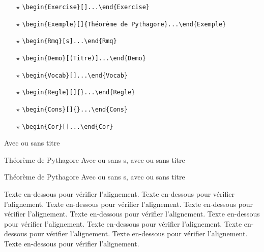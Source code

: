 \documentclass[12pt,french,oneside]{book}
\begin{document}
\begin{spacing}{1.2}
\begin{itemize}
\item[$\star$] \verb=\begin{Exercise}[]...\end{Exercise}=\,

\item[$\star$] \verb=\begin{Exemple}[]{Théorème de Pythagore}...\end{Exemple}=\,

\item[$\star$] \verb=\begin{Rmq}[s]...\end{Rmq}=\,

\item[$\star$] \verb=\begin{Demo}[(Titre)]...\end{Demo}=\,

\item[$\star$] \verb=\begin{Vocab}[]...\end{Vocab}=\,

\item[$\star$] \verb=\begin{Regle}[]{}...\end{Regle}=\,

\item[$\star$] \verb=\begin{Cons}[]{}...\end{Cons}=\,

\item[$\star$] \verb=\begin{Cor}[]...\end{Cor}=\,

\end{itemize}

\begin{Thm}
Avec ou sans titre
\end{Thm}

\begin{Prop}[s]{Théorème de Pythagore}
Avec ou sans s, avec ou sans titre
\end{Prop}


\begin{Defi}[]{Théorème de Pythagore}
Avec ou sans s, avec ou sans titre
\end{Defi}

Texte en-dessous pour vérifier l'alignement. 
Texte en-dessous pour vérifier l'alignement. 
Texte en-dessous pour vérifier l'alignement. 
Texte en-dessous pour vérifier l'alignement. 
Texte en-dessous pour vérifier l'alignement. 
Texte en-dessous pour vérifier l'alignement. 
Texte en-dessous pour vérifier l'alignement. 
Texte en-dessous pour vérifier l'alignement. 
Texte en-dessous pour vérifier l'alignement. 
Texte en-dessous pour vérifier l'alignement. 


\end{spacing}
\end{document}
